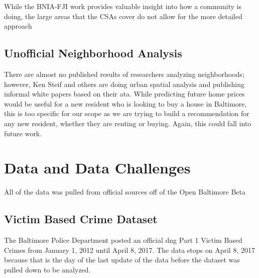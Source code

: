 \documentclass[conference]{IEEEtran}
\begin{document}
While the BNIA-FJI work provides valuable insight into how a community is doing, the large areas that the CSAs cover do
not allow for the more detailed approach


\subsection{Unofficial Neighborhood Analysis}
There are almost no published results of researchers analyzing neighborhoods; however, Ken Steif and others are doing
urban spatial analysis and publishing informal white papers based on their ata.
While predicting future home prices would be useful for a new resident who is looking to buy a house in Baltimore, this is too specific for
our scope as we are trying to build a recommendation for any new resident, whether they are renting or buying.  Again,
this could fall into future work.

\section{Data and Data Challenges}
All of the data was pulled from official sources off of the Open Baltimore Beta 

\subsection{Victim Based Crime Dataset}
The Baltimore Police Department posted an official dng Part 1 Victim Based Crimes from January 1, 2012
until April 8, 2017. The data stops on April 8, 2017 because that is the day of the last update of the data before the
dataset was pulled down to be analyzed.
\end{document}
